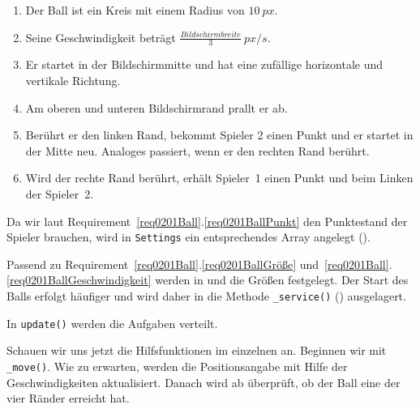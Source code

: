 \begin{enumerate}
	\item Der Ball ist ein Kreis mit einem Radius von $10~px$.\label{req0201BallGröße}
	\item Seine Geschwindigkeit beträgt $\frac{Bildschirmbreite}{3}~px/s$.\label{req0201BallGeschwindigkeit}
	\item Er startet in der Bildschirmmitte und hat eine zufällige horizontale und vertikale Richtung.\label{req0201BallStart}
	\item Am oberen und unteren Bildschirmrand prallt er ab.\label{req0201BallObenUnten}
	\item Berührt er den linken Rand, bekommt Spieler 2 einen Punkt und er startet in der Mitte neu. Analoges passiert, wenn er den rechten Rand berührt.\label{req0201BallRechtsLinks}
	\item Wird der rechte Rand berührt, erhält Spieler~1 einen Punkt und beim Linken der Spieler~2.\label{req0201BallPunkt} 
\end{enumerate}
\er

Da wir laut Requirement~\ref{req0201Ball}.\ref{req0201BallPunkt} den Punktestand der Spieler brauchen, wird in \texttt{Settings} ein entsprechendes Array angelegt ().



Passend zu Requirement~\ref{req0201Ball}.\ref{req0201BallGröße} und~\ref{req0201Ball}.\ref{req0201BallGeschwindigkeit} werden in  und  die Größen festgelegt. Der Start des Balls erfolgt häufiger und wird daher in die Methode \texttt{\_service()} () ausgelagert.


In \texttt{update()} werden die Aufgaben verteilt.


Schauen wir uns jetzt die Hilfsfunktionen im einzelnen an. Beginnen wir mit \texttt{\_move()}. Wie zu erwarten, werden die Positionsangabe mit Hilfe der Geschwindigkeiten aktualisiert. Danach wird ab  überprüft, ob der Ball eine der vier Ränder erreicht hat.

